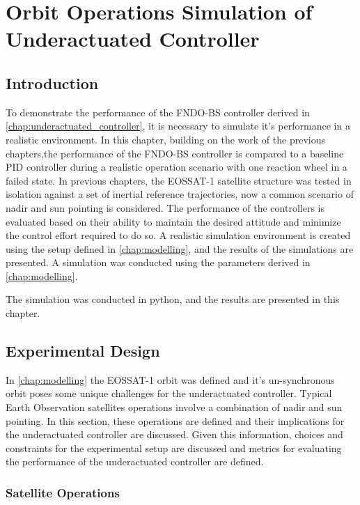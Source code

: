 \chapter{Orbit Operations Simulation of Underactuated Controller}

\section{Introduction}
To demonstrate the performance of the FNDO-BS controller derived in \autoref{chap:underactuated_controller}, it is necessary to simulate it's performance in a realistic environment. In this chapter, building on the work of the previous chapters,the performance of the FNDO-BS controller is compared to a baseline PID controller during a realistic operation scenario with one reaction wheel in a failed state. In previous chapters, the EOSSAT-1 satellite structure was tested in isolation against a set of inertial reference trajectories, now a common scenario of nadir and sun pointing is considered.  The performance of the controllers is evaluated based on their ability to maintain the desired attitude and minimize the control effort required to do so. A realistic simulation environment is created using the setup defined in \autoref{chap:modelling}, and the results of the simulations are presented.
A simulation was conducted using the parameters derived in \autoref{chap:modelling}.

The simulation was conducted in python, and the results are presented in this chapter.

\section{Experimental Design}
In \autoref{chap:modelling} the EOSSAT-1 orbit was defined and it's un-synchronous orbit poses some unique challenges for the underactuated controller. Typical Earth Observation satellites operations involve a combination of nadir and sun pointing. In this section, these operations are defined and their implications for the underactuated controller are discussed. Given this information, choices and constraints for the experimental setup are discussed and metrics for evaluating the performance of the underactuated controller are defined. 

\subsection{Satellite Operations}

